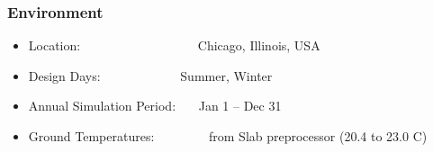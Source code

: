 \subsubsection{Environment}\label{environment}

\begin{itemize}
\item
  Location:~~~~~~~~~~~~~~~~~~ Chicago, Illinois, USA
\item
  Design Days:~~~~~~~~~~~~ Summer, Winter
\item
  Annual Simulation Period:~~~ Jan 1 -- Dec 31
\item
  Ground Temperatures:~~~~~~~~ from Slab preprocessor (20.4 to 23.0 C)
\end{itemize}
